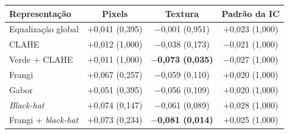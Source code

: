 \begin{tabular}{lccc}
\toprule
Representação & Pixels & Textura & Padrão da IC \\
\midrule
Equalização global & $+$0,041 (0,395) & $-$0,001 (0,951) & $+$0,023 (1,000) \\
CLAHE & $+$0,012 (1,000) & $-$0,038 (0,173) & $-$0,021 (1,000) \\
Verde + CLAHE & $+$0,011 (1,000) & \textbf{$-$0,073 (0,035)} & $-$0,027 (1,000) \\
\midrule
Frangi & $+$0,067 (0,257) & $-$0,059 (0,110) & $+$0,020 (1,000) \\
Gabor & $+$0,051 (0,395) & $-$0,056 (0,109) & $+$0,020 (1,000) \\
\textit{Black-hat} & $+$0,074 (0,147) & $-$0,061 (0,089) & $+$0,028 (1,000) \\
Frangi + \textit{black-hat} & $+$0,073 (0,234) & \textbf{$-$0,081 (0,014)} & $+$0,025 (1,000) \\
\bottomrule
\end{tabular}
